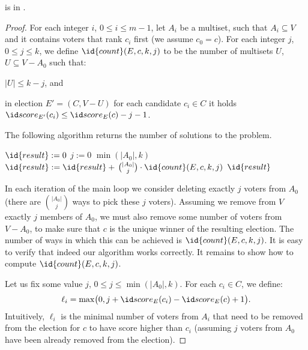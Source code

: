\begin{theorem} \label{th:pldvc}
	 is in \FPclass.
\end{theorem}

\begin{proof}
For each integer $i$, $0\le i\le m-1$, let $A_i$ be a multiset, such that $A_i\subseteq V$ and it contains voters that rank $c_i$ first (we assume $c_0=c$).
For each integer $j$, $0\le j\le k$, we define $\id{count}(E,c,k,j)$ to be the number of multisets $U$, $U\subseteq V-A_0$ such that:
\begin{Enumerate}
	\item $|U|\le k-j$, and
	\item in election $E'=(C,V-U)$ for each candidate $c_i\in C$ it holds $\score{E'}(c_i)\le\score{E}(c)-j-1$.
\end{Enumerate}
The following algorithm returns the number of solutions to the problem.

\begin{codebox}
\li	$\id{result}:=0$ \label{pldvc:result_init}
\li	\For $j:=0$ \To $\min(|A_0|,k)$ \label{pldvc:counting_loop}
\li		\Do $\id{result}:=\id{result}+\,\binom{|A_0|}{j}\cdot\id{count}(E,c,k,j)$ \label{pldvc:counting}
		\End
\li	\Return $\id{result}$ \label{pldvc:returning_result}
\end{codebox}

In each iteration of the main loop we consider deleting exactly $j$ voters from $A_0$ (there are $\binom{|A_0|}{j}$ ways to pick these $j$ voters).
Assuming we remove from $V$ exactly $j$ members of $A_0$, we must also remove some number of voters from $V-A_0$, to make sure that $c$ is the unique winner of the resulting election.
The number of ways in which this can be achieved is $\id{count}(E,c,k,j)$.
It is easy to verify that indeed our algorithm works correctly.
It remains to show how to compute $\id{count}(E,c,k,j)$.

Let us fix some value $j$, $0\le j\le\min(|A_0|,k)$.
For each $c_i\in C$, we define:
\[
    \ell_i = \max\bigl(0,j+\score{E}(c_i)-\score{E}(c)+1\bigr).
\]
Intuitively, $\ell_i$ is the minimal number of voters from $A_i$ that need to be removed from the election for $c$ to have score higher than $c_i$ (assuming $j$ voters from $A_0$ have been already removed from the election).


\end{proof}
